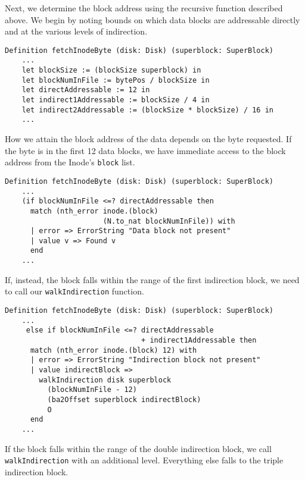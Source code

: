 \documentclass[nocopyrightspace,preprint]{sigplanconf}
\begin{document}
Next, we determine the block address using the recursive function described
above. We begin by noting bounds on which data blocks are addressable directly
and at the various levels of indirection.

\begin{lstlisting}
Definition fetchInodeByte (disk: Disk) (superblock: SuperBlock)
    ...
    let blockSize := (blockSize superblock) in
    let blockNumInFile := bytePos / blockSize in
    let directAddressable := 12 in
    let indirect1Addressable := blockSize / 4 in
    let indirect2Addressable := (blockSize * blockSize) / 16 in
    ...
\end{lstlisting}

How we attain the block address of the data depends on the byte requested. If
the byte is in the first 12 data blocks, we have immediate access to the block
address from the Inode's {\tt block} list.

\begin{lstlisting}
Definition fetchInodeByte (disk: Disk) (superblock: SuperBlock)
    ...
    (if blockNumInFile <=? directAddressable then
      match (nth_error inode.(block) 
                       (N.to_nat blockNumInFile)) with
      | error => ErrorString "Data block not present"
      | value v => Found v
      end
    ...
\end{lstlisting}

If, instead, the block falls within the range of the first indirection block,
we need to call our {\tt walkIndirection} function.

\begin{lstlisting}
Definition fetchInodeByte (disk: Disk) (superblock: SuperBlock)
    ...
     else if blockNumInFile <=? directAddressable
                                + indirect1Addressable then
      match (nth_error inode.(block) 12) with
      | error => ErrorString "Indirection block not present"
      | value indirectBlock => 
        walkIndirection disk superblock 
          (blockNumInFile - 12)
          (ba2Offset superblock indirectBlock) 
          O
      end
    ...
\end{lstlisting}

If the block falls within the range of the double indirection block, we call
{\tt walkIndirection} with an additional level. Everything else falls to the
triple indirection block.
\end{document}
